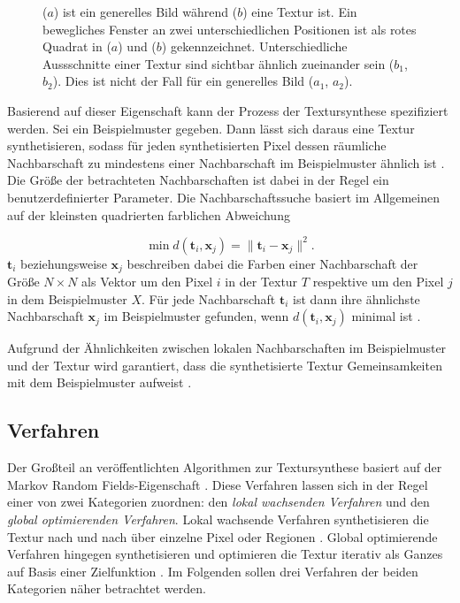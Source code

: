 \begin{figure}
\begin{subfigure}{0.45\textwidth}
	\end{subfigure}
	
	\caption{
		($a$) ist ein generelles Bild während ($b$) eine Textur ist.
		Ein bewegliches Fenster an zwei unterschiedlichen Positionen ist als rotes Quadrat in ($a$) und ($b$) gekennzeichnet.
		Unterschiedliche Aussschnitte einer Textur sind sichtbar ähnlich zueinander sein ($b_1$, $b_2$).
		Dies ist nicht der Fall für ein generelles Bild ($a_1$, $a_2$).
	}
	\label{mrf}
\end{figure}

Basierend auf dieser Eigenschaft kann der Prozess der Textursynthese spezifiziert werden.
Sei ein Beispielmuster gegeben.
Dann lässt sich daraus eine Textur synthetisieren, sodass für jeden synthetisierten Pixel dessen räumliche Nachbarschaft zu mindestens einer Nachbarschaft im Beispielmuster ähnlich ist \cite{StateOfTheArt}.
Die Größe der betrachteten Nachbarschaften ist dabei in der Regel ein benutzerdefinierter Parameter.
Die Nachbarschaftssuche basiert im Allgemeinen auf der kleinsten quadrierten farblichen Abweichung 

\begin{equation}
	\label{nachbarschaftssuche}
	\min d(\textbf{t}_i, \textbf{x}_j) = \lVert \textbf{t}_i - \textbf{x}_j \rVert^2\text{.}
\end{equation}
$\textbf{t}_i$ beziehungsweise $\textbf{x}_j$ beschreiben dabei die Farben einer Nachbarschaft der Größe $N \times N$ als Vektor um den Pixel $i$ in der Textur $T$ respektive um den Pixel $j$ in dem Beispielmuster $X$.
Für jede Nachbarschaft $\textbf{t}_i$ ist dann ihre ähnlichste Nachbarschaft $\textbf{x}_j$ im Beispielmuster gefunden, wenn $d(\textbf{t}_i, \textbf{x}_j)$ minimal ist \cite{TextureOptimization}.

Aufgrund der Ähnlichkeiten zwischen lokalen Nachbarschaften im Beispielmuster und der Textur wird garantiert, dass die synthetisierte Textur Gemeinsamkeiten mit dem Beispielmuster aufweist \cite{StateOfTheArt}.

\subsection{Verfahren}

Der Großteil an veröffentlichten Algorithmen zur Textursynthese basiert auf der \glqq Markov Random Fields\grqq -Eigenschaft \cite{StateOfTheArt}.
Diese Verfahren lassen sich in der Regel einer von zwei Kategorien zuordnen: den \emph{lokal wachsenden Verfahren} und den \emph{global optimierenden Verfahren}.
Lokal wachsende Verfahren synthetisieren die Textur nach und nach über einzelne Pixel oder Regionen \cite{TextureOptimization}.
Global optimierende Verfahren hingegen synthetisieren und optimieren die Textur iterativ als Ganzes auf Basis einer Zielfunktion \cite{SelfTuning}.
Im Folgenden sollen drei Verfahren der beiden Kategorien näher betrachtet werden.

